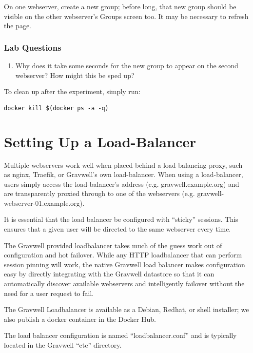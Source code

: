 On one webserver, create a new group; before long, that new group
should be visible on the other webserver's Groups screen too. It may be
necessary to refresh the page.

\subsubsection{Lab Questions}

\begin{enumerate}
\item
  Why does it take some seconds for the new group to appear on the
  second webserver? How might this be sped up?
\end{enumerate}

To clean up after the experiment, simply run:

\begin{Verbatim}[breaklines=true]
docker kill $(docker ps -a -q)
\end{Verbatim}



\section{Setting Up a Load-Balancer}
Multiple webservers work well when placed behind a load-balancing
proxy, such as nginx, Traefik, or Gravwell's own load-balancer. 
When using a load-balancer, users simply access
the load-balancer's address (e.g. gravwell.example.org) and are
transparently proxied through to one of the webservers (e.g.
gravwell-webserver-01.example.org).

It is essential that the load balancer be configured with ``sticky''
sessions. This ensures that a given user will be directed to the same
webserver every time.

The Gravwell provided loadbalancer takes much of the guess work out of
configuration and hot failover.  While any HTTP loadbalancer that can
perform session pinning will work, the native Gravwell load balancer
makes configuration easy by directly integrating with the Gravwell
datastore so that it can automatically discover available webservers
and intelligently failover without the need for a user request to fail.

The Gravwell Loadbalancer is available as a Debian, Redhat, or shell
installer; we also publish a docker container in the Docker Hub.

The load balancer configuration is named ``loadbalancer.conf'' and is
typically located in the Gravwell ``etc'' directory.

